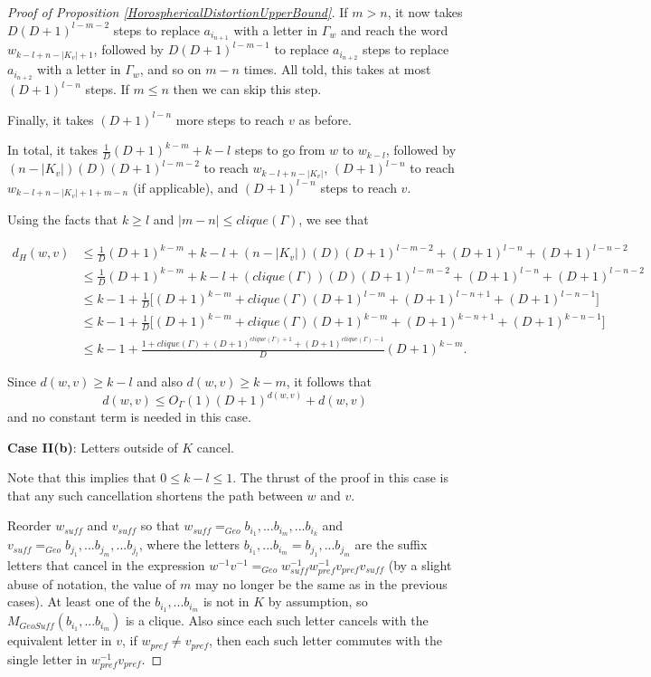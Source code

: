 \documentclass[10pt,a4paper]{amsart}
\theoremstyle{definition}
\theoremstyle{remark}
\begin{document}
\begin{proof} [Proof of Proposition \ref{HorosphericalDistortionUpperBound}]
		If $m>n$, it now takes $D(D+1)^{l-m-2}$ steps to replace $a_{i_{n+1}}$ with a letter in $\Gamma_w$ and reach the word $w_{k-l+n-|K_v|+1}$, followed by $D(D+1)^{l-m-1}$ to replace $a_{i_{n+2}}$ steps to replace $a_{i_{n+2}}$ with a letter in $\Gamma_w$, and so on $m-n$ times. All told, this takes at most $(D+1)^{l-n}$ steps. If $m\le n$ then we can skip this step.
		
		Finally, it takes $(D+1)^{l-n}$ more steps to reach $v$ as before.
		
		In total, it takes $\frac{1}{D}(D+1)^{k-m}+k-l$ steps to go from $w$ to $w_{k-l}$, followed by \newline $(n-|K_v|)(D)(D+1)^{l-m-2}$ to reach $w_{k-l+n-|K_v|}$, $(D+1)^{l-n}$ to reach $w_{k-l+n-|K_v|+1+m-n}$ (if applicable), and $(D+1)^{l-n}$ steps to reach $v$.
		
		Using the facts that $k\ge l$ and $|m-n|\le clique(\Gamma)$, we see that
		
		\begin{align*}
			d_H(w,v) & \le \frac{1}{D}(D+1)^{k-m} + k-l + (n-|K_v|)(D)(D+1)^{l-m-2} + (D+1)^{l-n} + (D+1)^{l-n-2}\\
			&\le \frac{1}{D}(D+1)^{k-m} + k-l + (clique(\Gamma))(D)(D+1)^{l-m-2} + (D+1)^{l-n} + (D+1)^{l-n-2}\\
			&\le k-1+ \frac{1}{D} \bigl[ (D+1)^{k-m}+clique(\Gamma)(D+1)^{l-m}+(D+1)^{l-n+1}+(D+1)^{l-n-1}\bigr]\\
			&\le k-1+ \frac{1}{D}\bigl[ (D+1)^{k-m}+clique(\Gamma)(D+1)^{k-m}+(D+1)^{k-n+1}+(D+1)^{k-n-1}\bigr]\\
			&\le k-1 + \frac{1+clique(\Gamma)+(D+1)^{clique(\Gamma)+1}+(D+1)^{clique(\Gamma)-1}}{D} (D+1)^{k-m}.
		\end{align*}
		
		Since $d(w,v)\ge k-l$ and also $d(w,v)\ge k-m$, it follows that $$d(w,v) \le O_\Gamma(1)(D+1)^{d(w,v)}+d(w,v)$$ and no constant term is needed in this case.
		
		\textbf{Case II(b)}: Letters outside of $K$ cancel.
		
		Note that this implies that $0\le k-l\le 1$. The thrust of the proof in this case is that any such cancellation shortens the path between $w$ and $v$. 
		
		Reorder $w_{suff}$ and $v_{suff}$ so that $w_{suff}=_{Geo}b_{i_1}, ... b_{i_m}, ... b_{i_k}$ and $v_{suff}=_{Geo}b_{j_1}, ... b_{j_m}, ... b_{j_l}$, where the letters $b_{i_1}, ... b_{i_m} = b_{j_1}, ... b_{j_m}$ are the suffix letters that cancel in the expression $w^{-1}v^{-1}=_{Geo}w_{suff}^{-1}w_{pref}^{-1}v_{pref}v_{suff}$ (by a slight abuse of notation, the value of $m$ may no longer be the same as in the previous cases). At least one of the $b_{i_1}, ... b_{i_m}$ is not in $K$ by assumption, so $M_{GeoSuff}(b_{i_1}, ... b_{i_m})$ is a clique. Also since each such letter cancels with the equivalent letter in $v$, if $w_{pref}\ne v_{pref}$, then each such letter commutes with the single letter in $w_{pref}^{-1}v_{pref}$. 
		

\end{proof}
\end{document}
